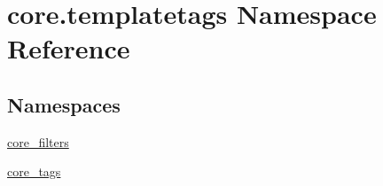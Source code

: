 \hypertarget{namespacecore_1_1templatetags}{\section{core.\-templatetags Namespace Reference}
\label{namespacecore_1_1templatetags}
}
\subsection*{Namespaces}
\begin{DoxyCompactItemize}
\item 
\hyperlink{namespacecore_1_1templatetags_1_1core__filters}{core\-\_\-filters}
\item 
\hyperlink{namespacecore_1_1templatetags_1_1core__tags}{core\-\_\-tags}
\end{DoxyCompactItemize}
